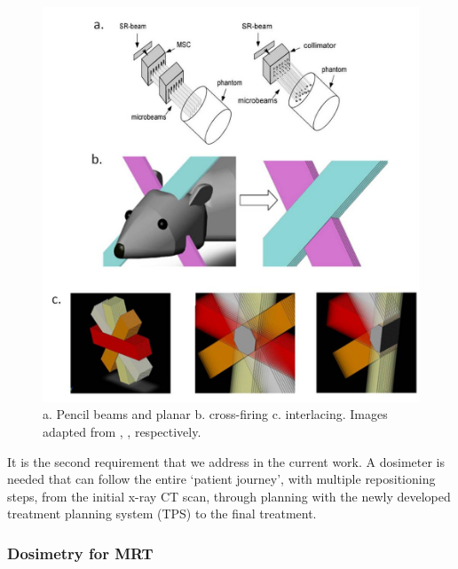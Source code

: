 	
\begin{figure}
\centering
\includegraphics[width=0.8\linewidth]{mrt_img/MRT_geometries}
\caption{a. Pencil beams and planar b. cross-firing c. interlacing. Images adapted from \cite{siegbahndetermination2006}, \cite{brauer-krischnew2005}, \cite{serduchigh-precision2010} respectively.}
\label{fig:MRT_geometries}
\end{figure}
	
	It is the second requirement that we address in the current work. 
	A dosimeter is needed that can follow the entire `patient journey', with multiple repositioning steps, from the initial x-ray CT scan, through planning with the newly developed treatment planning system (TPS) to the final treatment. 
	
	
	\subsubsection{Dosimetry for MRT}
	
